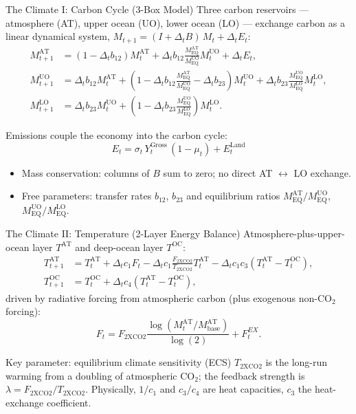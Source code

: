 \documentclass[aspectratio=169,11pt]{beamer}
\newcommand{\emphc}[1]{\textcolor{harvardcrimson}{#1}}
\begin{document}
\begin{frame}{The Climate I: Carbon Cycle (3-Box Model)}
\small
Three carbon reservoirs --- atmosphere (AT), upper ocean (UO), lower ocean (LO) --- exchange carbon as a \emphc{linear dynamical system}, $M_{t+1} = (I + \Delta_t B)\, M_t + \Delta_t E_t$:
\begin{align*}
M^{\text{AT}}_{t+1} &= (1- \Delta_t b_{12}) M^{\text{AT}}_{t} + \Delta_t b_{12} \tfrac{M^{\text{AT}}_{\text{EQ}}}{M^{\text{UO}}_{\text{EQ}}} M^{\text{UO}}_{t} +  \Delta_t E_t ,\\
M^{\text{UO}}_{t+1} &= \Delta_t b_{12} M^{\text{AT}}_{t} + (1- \Delta_t b_{12} \tfrac{M^{\text{AT}}_{\text{EQ}}}{M^{\text{UO}}_{\text{EQ}}} - \Delta_t b_{23}) M^{\text{UO}}_{t} + \Delta_t b_{23} \tfrac{M^{\text{UO}}_{\text{EQ}}}{M^{\text{LO}}_{\text{EQ}}} M^{\text{LO}}_{t} ,\\
M^{\text{LO}}_{t+1} &= \Delta_t b_{23} M^{\text{UO}}_{t} + (1-\Delta_t b_{23} \tfrac{M^{\text{UO}}_{\text{EQ}}}{M^{\text{LO}}_{\text{EQ}}}) M^{\text{LO}}_{t} .
\end{align*}

Emissions couple the economy into the carbon cycle:
\[
\boxed{\;E_t = \sigma_t\, Y^{\text{Gross}}_{t}\, (1-\mu_t) + E^{\text{Land}}_t\;}
\]

\begin{itemize}
    \item Mass conservation: columns of $B$ sum to zero; no direct AT $\leftrightarrow$ LO exchange.
    \item Free parameters: transfer rates $b_{12}$, $b_{23}$ and equilibrium ratios $M^{\text{AT}}_{\text{EQ}}/M^{\text{UO}}_{\text{EQ}}$, $M^{\text{UO}}_{\text{EQ}}/M^{\text{LO}}_{\text{EQ}}$.
\end{itemize}
\end{frame}

\begin{frame}{The Climate II: Temperature (2-Layer Energy Balance)}
\small
Atmosphere-plus-upper-ocean layer $T^{\text{AT}}$ and deep-ocean layer $T^{\text{OC}}$:
\begin{align*}
T^{\text{AT}}_{t+1} &= T^{\text{AT}}_{t} + \Delta_t c_1 F_t  - \Delta_t c_1 \frac{F_{\text{2XCO2}}}{T_{\text{2XCO2}}} T^{\text{AT}}_{t} - \Delta_t c_1 c_3 \left(T^{\text{AT}}_{t}-T^{\text{OC}}_{t}\right),    \\
T^{\text{OC}}_{t+1} &= T^{\text{OC}}_{t} + \Delta_t c_4 \left(T^{\text{AT}}_{t}  - T^{\text{OC}}_{t}\right),
\end{align*}
driven by radiative forcing from atmospheric carbon (plus exogenous non-CO$_2$ forcing):
\[
F_{t} = F_{\text{2XCO2}} \frac{\log\!\left(M^{\text{AT}}_{t}/M^{\text{AT}}_{\text{base}}\right)}{\log(2)} + F^{EX}_{t}.
\]

\begin{alertblock}{Key parameter: equilibrium climate sensitivity (ECS)}
$T_{\text{2XCO2}}$ is the long-run warming from a doubling of atmospheric CO$_2$; the feedback strength is $\lambda = F_{\text{2XCO2}}/T_{\text{2XCO2}}$. Physically, $1/c_1$ and $c_3/c_4$ are heat capacities, $c_3$ the heat-exchange coefficient.
\end{alertblock}
\end{frame}
\end{document}
